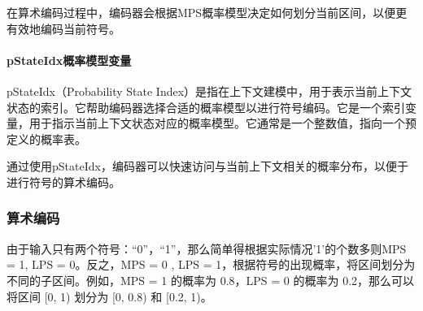 \documentclass{/home/hi/Study/template/code}
\begin{document}
在算术编码过程中，编码器会根据MPS概率模型决定如何划分当前区间，以便更有效地编码当前符号。

\paragraph{pStateIdx概率模型变量}
\begin{definition}
	pStateIdx（Probability State Index）是指在上下文建模中，用于表示当前上下文状态的索引。它帮助编码器选择合适的概率模型以进行符号编码。它是一个索引变量，用于指示当前上下文状态对应的概率模型。它通常是一个整数值，指向一个预定义的概率表。
\end{definition}

通过使用pStateIdx，编码器可以快速访问与当前上下文相关的概率分布，以便于进行符号的算术编码。

\subsubsection{算术编码}
由于输入只有两个符号：“0”，“1”，那么简单得根据实际情况'1'的个数多则MPS = 1, LPS = 0。反之，MPS = 0 , LPS = 1，根据符号的出现概率，将区间划分为不同的子区间。例如，MPS = 1 的概率为 0.8，LPS = 0 的概率为 0.2，那么可以将区间 [0, 1) 划分为 [0, 0.8) 和 [0.2, 1)。
\end{document}
